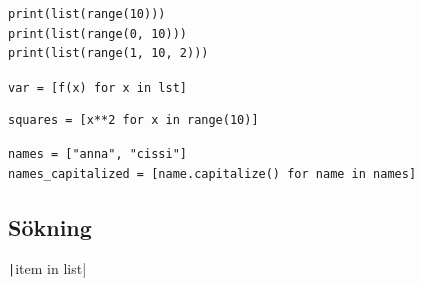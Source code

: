 \begin{frame}[fragile]
  \begin{example}
    \inputminted{python}{examples/extend_lists.py}
  \end{example}
\end{frame}

\begin{frame}[fragile]
  \begin{example}
    \begin{verbatim}
print(list(range(10)))
print(list(range(0, 10)))
print(list(range(1, 10, 2)))
    \end{verbatim}
  \end{example}
\end{frame}

\begin{frame}[fragile]
  \texttt{var = [f(x) for x in lst]}
\end{frame}

\begin{frame}[fragile]
  \begin{example}
    \begin{verbatim}
squares = [x**2 for x in range(10)]
    \end{verbatim}
  \end{example}

  \pause

  \begin{example}
    \begin{verbatim}
names = ["anna", "cissi"]
names_capitalized = [name.capitalize() for name in names]
    \end{verbatim}
  \end{example}
\end{frame}


\subsection{Sökning}

\begin{frame}[fragile]
  \texttt|item in list|
\end{frame}

\begin{frame}[fragile]
  \begin{example}[isin.py]
    \inputminted{python}{examples/isin.py}
  \end{example}
\end{frame}

